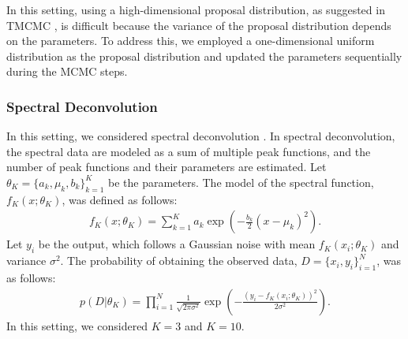 \documentclass[12pt]{article}
\begin{document}
In this setting, using a high-dimensional proposal distribution, as suggested in TMCMC \cite{ching2007transitional}, is difficult because the variance of the proposal distribution depends on the parameters. 
To address this, we employed a one-dimensional uniform distribution as the proposal distribution and updated the parameters sequentially during the MCMC steps. \par


\subsubsection{Spectral Deconvolution}
In this setting, we considered spectral deconvolution \cite{Nagata2012}.
In spectral deconvolution, the spectral data are modeled as a sum of multiple peak functions, and the number of peak functions and their parameters are estimated.
Let $\theta_K = \{a_k, \mu_k, b_k\}_{k=1}^K$ be the parameters. The model of the spectral function, $f_K(x;\theta_K)$, was defined as follows:
\begin{align}
  f_K(x;\theta_K) = \sum_{k=1}^K a_k\exp\left(-\frac{b_k}{2}(x - \mu_k)^2\right).
\end{align}
Let $y_i$ be the output, which follows a Gaussian noise with mean $f_K(x_i;\theta_K)$ and variance $\sigma^2$.
The probability of obtaining the observed data, $D = \{x_i, y_i\}_{i=1}^N$, was as follows:
\begin{align}
  p(D|\theta_K) = \prod_{i=1}^N \frac{1}{\sqrt{2\pi\sigma^2}}\exp\left(-\frac{(y_i - f_K(x_i;\theta_K))^2}{2\sigma^2}\right).
\end{align}
In this setting, we considered $K = 3$ and $K = 10$. 
\end{document}
